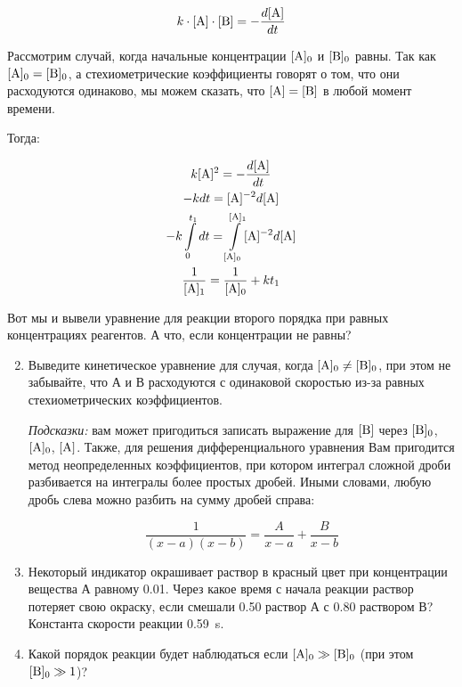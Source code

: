 \begin{equation*}
    k \cdot [\ce{A}] \cdot [\ce{B}] = - \frac{d[\ce{A}]}{dt}
\end{equation*}

Рассмотрим случай, когда начальные концентрации $[\ce{A}]_0$ и $[\ce{B}]_0$ равны. Так как $[\ce{A}]_0 = [\ce{B}]_0$, а стехиометрические коэффициенты говорят о том, что они расходуются одинаково, мы можем сказать, что $[\ce{A}] = [\ce{B}]$ в любой момент времени.

Тогда:

\begin{gather*}
    k [\ce{A}]^2 = -\frac{d[\ce{A}]}{dt} \\
    -kdt = [\ce{A}]^{-2} d[\ce{A}] \\
    -k \int\limits_{0}^{t_1} dt = \int\limits_{[\ce{A}]_0}^{[\ce{A}]_1} [\ce{A}]^{-2} d [\ce{A}] \\
    \frac{1}{[\ce{A}]_1} = \frac{1}{[\ce{A}]_0} + kt_1
\end{gather*}

Вот мы и вывели уравнение для реакции второго порядка при равных концентрациях реагентов. А что, если концентрации не равны?

\begin{enumerate}
    \setcounter{enumi}{1}
    \item Выведите кинетическое уравнение для случая, когда $[\ce{A}]_0 \neq [\ce{B}]_0$, при этом не забывайте, что А и В расходуются с одинаковой скоростью из-за равных стехиометрических коэффициентов.

    \textit{Подсказки:} вам может пригодиться записать выражение для $[\ce{B}]$ через $[\ce{B}]_0$, $[\ce{A}]_0$, $[\ce{A}]$. Также, для решения дифференциального уравнения Вам пригодится метод неопределенных коэффициентов, при котором интеграл сложной дроби разбивается на интегралы более простых дробей. Иными словами, любую дробь слева можно разбить на сумму дробей справа:
    
    \begin{equation*}
        \frac{1}{(x-a)(x-b)} = \frac{A}{x-a} + \frac{B}{x-b}
    \end{equation*}

    \item Некоторый индикатор окрашивает раствор в красный цвет при концентрации вещества А равному 0.01\unit{\moll}. Через какое время с начала реакции раствор потеряет свою окраску, если смешали 0.50\unit{\moll} раствор А с 0.80\unit{\moll} раствором В? Константа скорости реакции 0.59\unit{\per\second}.
    
    \item Какой порядок реакции будет наблюдаться если $[\ce{A}]_0 \gg [\ce{B}]_0$ (при этом $[\ce{B}]_0 \gg 1$)?
\end{enumerate}

